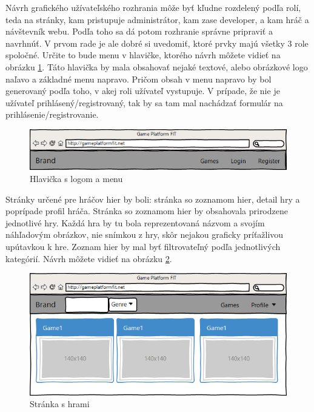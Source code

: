 Návrh grafického užívateľského rozhrania môže byť kľudne rozdelený podľa rolí, teda na stránky, kam pristupuje administrátor, kam zase developer, a kam hráč a návštevník webu. Podľa toho sa dá potom rozhranie správne pripraviť a navrhnúť. V prvom rade je ale dobré si uvedomiť, ktoré prvky majú všetky 3 role spoločné. Určite to bude menu v hlavičke, ktorého návrh môžete vidieť na obrázku \ref{fig:guihlavicka}. Táto hlavička by mala obsahovať nejaké textové, alebo obrázkové logo naľavo a základné menu napravo. Pričom obsah v menu napravo by bol generovaný podľa toho, v akej roli užívateľ vystupuje. V prípade, že nie je užívateľ prihlásený/registrovaný, tak by sa tam mal nachádzať formulár na prihlásenie/registrovanie. 
\begin{figure}[h]
  \centering
  \includegraphics[scale=0.50]{fig/gui-hlavicka.png}
  \caption{Hlavička s logom a menu}
  \label{fig:guihlavicka}
\end{figure}

Stránky určené pre hráčov hier by boli: stránka so zoznamom hier, detail hry a poprípade profil hráča. Stránka so zoznamom hier by obsahovala prirodzene jednotlivé hry. Každá hra by tu bola reprezentovaná názvom a svojím náhľadovým obrázkov, nie snímkou z hry, skôr nejakou graficky príťažlivou upútavkou k hre. Zoznam hier by mal byť filtrovateľný podľa jednotlivých kategórií. Návrh môžete vidieť na obrázku \ref{fig:guihry}.
\begin{figure}[h]
  \centering
  \includegraphics[scale=0.48]{fig/gui-hry.png}
  \caption{Stránka s hrami}
  \label{fig:guihry}
\end{figure}

